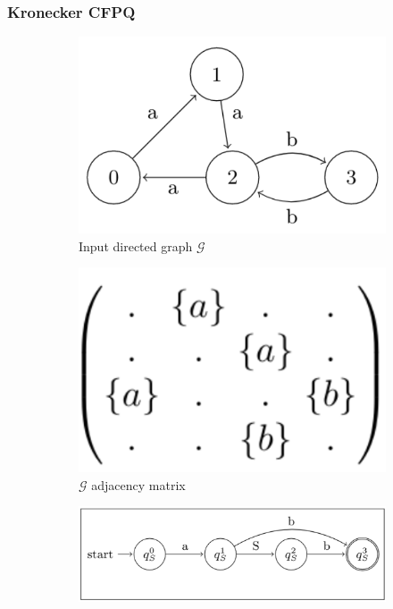 \documentclass[xcolor=table,english]{beamer}
\begin{document}
\begin{frame}[fragile] \frametitle{Kronecker CFPQ}
    \begin{figure}
        \centering
        \begin{subfigure}[b]{0.2\textwidth}
            \includegraphics[width=\textwidth]{figures/graph.png}
            \caption{Input directed graph $\mathcal{G}$}
        \end{subfigure}
        \hfill
        \begin{subfigure}[b]{0.2\textwidth}
            \includegraphics[width=\textwidth]{figures/graph_matrix.png}
            \caption{$\mathcal{G}$ adjacency matrix}
        \end{subfigure}
        \hfill
        \begin{subfigure}[b]{0.2\textwidth}
            \includegraphics[width=\textwidth]{figures/automata.png}

\end{subfigure}
\end{figure}
\end{frame}
\end{document}
